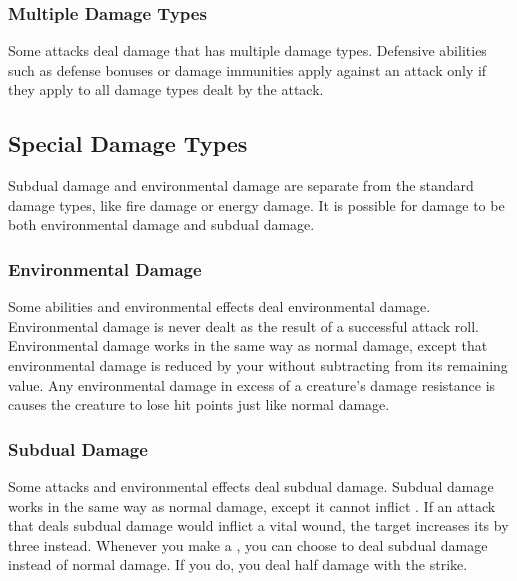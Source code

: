         \subsubsection{Multiple Damage Types}\label{Multiple Damage Types}
            Some attacks deal damage that has multiple damage types.
            Defensive abilities such as defense bonuses or damage immunities apply against an attack only if they apply to all damage types dealt by the attack.

    \subsection{Special Damage Types}\label{Special Damage Types}

        Subdual damage and environmental damage are separate from the standard damage types, like fire damage or energy damage.
        It is possible for damage to be both environmental damage and subdual damage.

        \subsubsection{Environmental Damage}\label{Environmental Damage}
            Some abilities and environmental effects deal environmental damage.
            Environmental damage is never dealt as the result of a successful attack roll.
            Environmental damage works in the same way as normal damage, except that environmental damage is reduced by your  without subtracting from its remaining value.
            Any environmental damage in excess of a creature's damage resistance is causes the creature to lose hit points just like normal damage.

        \subsubsection{Subdual Damage}\label{Subdual Damage}
            Some attacks and environmental effects deal subdual damage.
            Subdual damage works in the same way as normal damage, except it cannot inflict .
            If an attack that deals subdual damage would inflict a vital wound, the target increases its  by three instead.
            Whenever you make a , you can choose to deal subdual damage instead of normal damage.
            If you do, you deal half damage with the strike.

